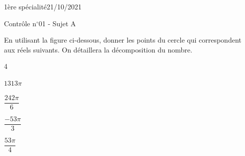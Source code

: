 \documentclass[a4paper,12pt]{article}        %
\begin{document}
\pagestyle{empty}
\vspace*{-1.5cm}
1ère spécialité\phantom{xxxxxxxxxxxxxxxxxxxxxxxxxxxxxxxxxxxxxxxxxxxxxxxxxxxxxxxxxxxxxxx}21/10/2021
{\begin{center}\Huge{Contrôle n$^{\circ}$01 - Sujet A}\end{center}}


En utilisant la figure ci-dessous, donner les points du cercle qui correspondent aux réels suivants. On détaillera la décomposition du nombre.
\begin{multicols}{4}
\begin{enumMet}
    \item $1313\pi$
    \item $\dfrac{242\pi}{6}$
    \item $\dfrac{-53\pi}{3}$
    \item $\dfrac{53\pi}{4}$
\end{enumMet}
\end{multicols}
\end{document}
